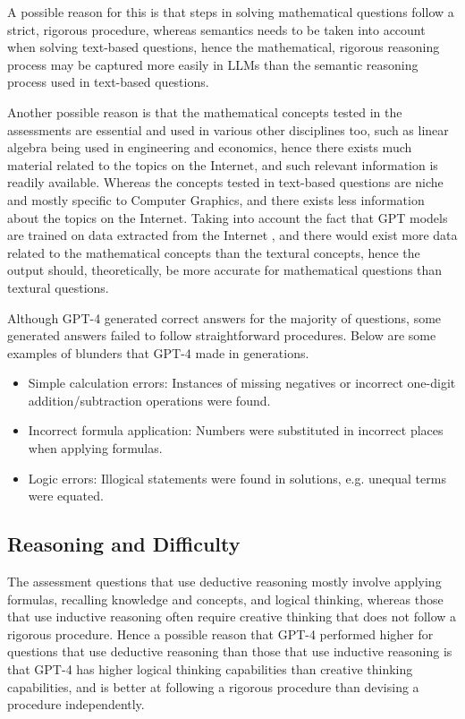 \documentclass[sigconf,authordraft]{acmart}
\begin{document}
A possible reason for this is that steps in solving mathematical questions follow a strict, rigorous procedure, whereas semantics needs to be taken into account when solving text-based questions, hence the mathematical, rigorous reasoning process may be captured more easily in LLMs than the semantic reasoning process used in text-based questions.

Another possible reason is that the mathematical concepts tested in the assessments are essential and used in various other disciplines too, such as linear algebra being used in engineering and economics, hence there exists much material related to the topics on the Internet, and such relevant information is readily available. Whereas the concepts tested in text-based questions are niche and mostly specific to Computer Graphics, and there exists less information about the topics on the Internet. Taking into account the fact that GPT models are trained on data extracted from the Internet \cite{gpt3}, and there would exist more data related to the mathematical concepts than the textural concepts, hence the output should, theoretically, be more accurate for mathematical questions than textural questions.

Although GPT-4 generated correct answers for the majority of questions, some generated answers failed to follow straightforward procedures. Below are some examples of blunders that GPT-4 made in generations.
\begin{itemize}
    \item Simple calculation errors: Instances of missing negatives or incorrect one-digit addition/subtraction operations were found.
    \item Incorrect formula application: Numbers were substituted in incorrect places when applying formulas.
    \item Logic errors: Illogical statements were found in solutions, e.g. unequal terms were equated.
\end{itemize}

\subsection{Reasoning and Difficulty}
The assessment questions that use deductive reasoning mostly involve applying formulas, recalling knowledge and concepts, and logical thinking, whereas those that use inductive reasoning often require creative thinking that does not follow a rigorous procedure. Hence a possible reason that GPT-4 performed higher for questions that use deductive reasoning than those that use inductive reasoning is that GPT-4 has higher logical thinking capabilities than creative thinking capabilities, and is better at following a rigorous procedure than devising a procedure independently.
\end{document}
